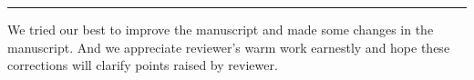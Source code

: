 \documentclass[12pt,superscriptaddress]{revtex4}
\begin{document}

\noindent\rule[0.25\baselineskip]{\textwidth}{1pt}

We tried our best to improve the manuscript and made some changes in the manuscript. And we appreciate reviewer's warm work earnestly and hope these corrections will clarify points raised by reviewer.

	
% 
% 
	
	
\end{document}
